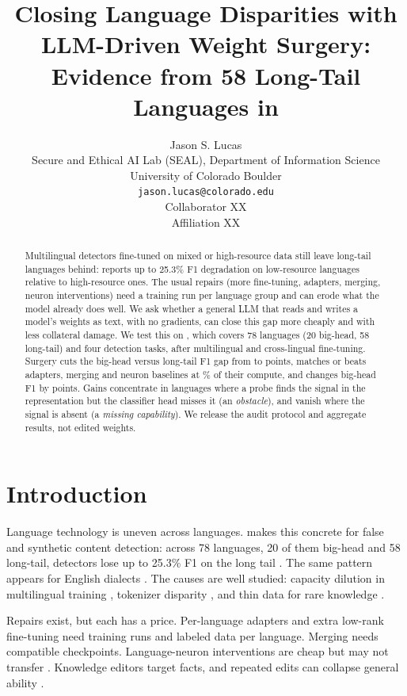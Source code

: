 \documentclass[11pt]{article}
\title{Closing Language Disparities with LLM-Driven Weight Surgery:\\
Evidence from 58 Long-Tail Languages in \bluff}
\author{Jason S. Lucas \\
  Secure and Ethical AI Lab (SEAL), Department of Information Science \\
  University of Colorado Boulder \\
  \texttt{jason.lucas@colorado.edu} \\\And
  Collaborator XX \\
  Affiliation XX}
\begin{document}
\maketitle

\begin{abstract}
Multilingual detectors fine-tuned on mixed or high-resource data still leave long-tail languages behind: \bluff{} reports up to 25.3\% F1 degradation on low-resource languages relative to high-resource ones. The usual repairs (more fine-tuning, adapters, merging, neuron interventions) need a training run per language group and can erode what the model already does well. We ask whether a general LLM that reads and writes a model's weights as text, with no gradients, can close this gap more cheaply and with less collateral damage. We test this on \bluff{}, which covers 78 languages (20 big-head, 58 long-tail) and four detection tasks, after multilingual and cross-lingual fine-tuning. Surgery cuts the big-head versus long-tail F1 gap from \xx{} to \xx{} points, matches or beats adapters, merging and neuron baselines at \xx{}\% of their compute, and changes big-head F1 by \xx{} points. Gains concentrate in languages where a probe finds the signal in the representation but the classifier head misses it (an \emph{obstacle}), and vanish where the signal is absent (a \emph{missing capability}). We release the audit protocol and aggregate results, not edited weights.
\end{abstract}

\section{Introduction}
Language technology is uneven across languages. \bluff{} makes this concrete for false and synthetic content detection: across 78 languages, 20 of them big-head and 58 long-tail, detectors lose up to 25.3\% F1 on the long tail \citep{lucas2026bluff}. The same pattern appears for English dialects \citep{lucas2026diaharm}. The causes are well studied: capacity dilution in multilingual training \citep{conneau2020xlmr,chang2024curse}, tokenizer disparity \citep{petrov2023tokenizers}, and thin data for rare knowledge \citep{kandpal2023longtail}.

Repairs exist, but each has a price. Per-language adapters \citep{pfeiffer2020madx} and extra low-rank fine-tuning \citep{biderman2024lora} need training runs and labeled data per language. Merging \citep{ilharco2023task,tao2024merging} needs compatible checkpoints. Language-neuron interventions \citep{tang2024lape,gurgurov2025arithmetics} are cheap but may not transfer \citep{mondal2025neurons}. Knowledge editors \citep{meng2022rome,meng2023memit} target facts, and repeated edits can collapse general ability \citep{zhang2026revive}.
\end{document}
